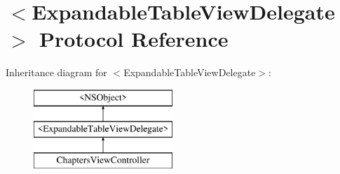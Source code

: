 \hypertarget{protocol_expandable_table_view_delegate-p}{\section{$<$Expandable\-Table\-View\-Delegate$>$ Protocol Reference}
\label{protocol_expandable_table_view_delegate-p}
}
Inheritance diagram for $<$Expandable\-Table\-View\-Delegate$>$\-:\begin{figure}[H]
\begin{center}
\leavevmode
\includegraphics[height=3.000000cm]{protocol_expandable_table_view_delegate-p}
\end{center}
\end{figure}
